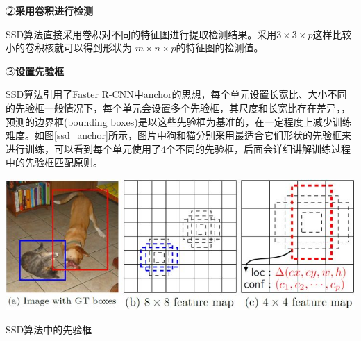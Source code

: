 \textcircled{２}\textbf{采用卷积进行检测}

SSD算法直接采用卷积对不同的特征图进行提取检测结果。采用$ 3\times 3 \times p $这样比较小的卷积核就可以得到形状为 $m\times n \times p $的特征图的检测值。 

\textcircled{３}\textbf{设置先验框 }

SSD算法引用了Faster R-CNN中anchor的思想，每个单元设置长宽比、大小不同的先验框一般情况下，每个单元会设置多个先验框，其尺度和长宽比存在差异，，预测的边界框(bounding boxes)是以这些先验框为基准的，在一定程度上减少训练难度。如图\ref{ssd_anchor}所示，图片中狗和猫分别采用最适合它们形状的先验框来进行训练，可以看到每个单元使用了4个不同的先验框，后面会详细讲解训练过程中的先验框匹配原则。
\begin{uscfigure}
	\includegraphics[width=\textwidth]{./Pictures/ssd_(3).jpg}	
	\caption{SSD算法中的先验框}
	\label{ssd_anchor}
\end{uscfigure}